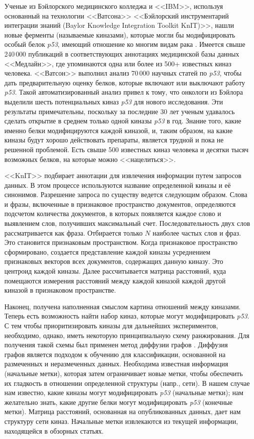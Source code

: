 Ученые из Бэйлорского медицинского колледжа и <<IBM>>, используя основанный на технологии <<Ватсона>> <<Бэйлорский 
инструментарий интеграции знаний (Baylor Knowledge Integration Toolkit KnIT)>>, нашли новые ферменты 
(называемые киназами), которые могли бы модифицировать особый белок \textit{p53}, имеющий отношение ко многим видам 
рака \cite{spangler2014automated}. Имеется свыше 240\,000 публикаций в соответствующих аннотациях медицинской базы 
данных <<Медлайн>>, где упоминаются одна или более из 500+ известных киназ человека. <<Ватсон>> выполнил анализ 70\,000 
научных статей по \textit{p53}, чтобы дать предварительную оценку белков, которые включают или выключают работу 
\textit{p53}. Такой автоматизированный анализ привел к тому, что онкологи из Бэйлора выделили шесть потенциальных 
киназ \textit{p53} для нового исследования. Эти результаты примечательны, поскольку за последние 30 лет ученым 
удавалось сделать открытие в среднем только одной киназы \textit{p53} в год. Знание того, какие именно белки 
модифицируются каждой киназой, и, таким образом, на какие киназы будут хорошо действовать препараты, является трудной и 
пока не решенной проблемой. Есть свыше 500 известных киназ человека и десятки тысяч возможных белков, на которые 
можно <<нацелиться>>. 

<<KnIT>> подбирает аннотации для извлечения информации путем запросов данных. В этом процессе используются название 
определенной киназы и её синонимов. Разрешение запроса по существу ведется следующим образом. Слова и фразы, включенные 
в признаковое пространство документов, определяются подсчетом количества документов, в которых появляется каждое слово 
и выявлением слов, получивших максимальный счет. Последовательность двух слов рассматривается как фраза. Отбирается 
только $N$ наиболее частых слов и фраз. Это становится признаковым пространством. Когда признаковое пространство 
сформировано, создается представление каждой киназы усреднением признаковых векторов всех документов, содержащих 
данную киназу. Это центроид каждой киназы. Далее рассчитывается матрица расстояний, куда помещаются измерения 
расстояний между каждой киназой каждой другой киназой в признаковом пространстве.

Наконец, получена наполненная смыслом картина отношений между киназами. Теперь есть возможность найти набор киназ, 
которые могут модифицировать \textit{p53}. С тем чтобы приоритизировать киназы для дальнейших экспериментов, 
необходимо, однако, иметь некоторую принципиальную схему ранжирования. Для получения такой схемы был применен метод 
диффузии графов \cite{zhou2003learning}. Диффузия графов является подходом к обучению для классификации, основанной 
на размеченных и неразмеченных данных. Необходима известная информация (начальные метки), которая затем ограничивает 
новые метки, чтобы обеспечить их гладкость в отношении определенной структуры (напр., сети). В нашем случае нам 
известно, какие киназы могут модифицировать \textit{p53} (начальные метки); нам желательно знать, какие другие белки 
могут модифицировать \textit{p53} (конечные метки). Матрица расстояний, основанная на опубликованных данных, дает нам 
структуру сети киназ. Начальные метки извлекаются из текущей информации, находящейся в обзорных статьях.

